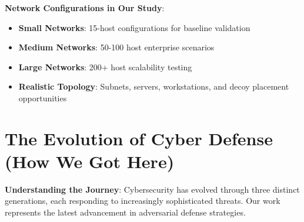\documentclass[11pt]{article}
\begin{document}
\begin{example}
\textbf{Network Configurations in Our Study}:
\begin{itemize}
\item \textbf{Small Networks}: 15-host configurations for baseline validation
\item \textbf{Medium Networks}: 50-100 host enterprise scenarios
\item \textbf{Large Networks}: 200+ host scalability testing
\item \textbf{Realistic Topology}: Subnets, servers, workstations, and decoy placement opportunities
\end{itemize}
\end{example}

\section{The Evolution of Cyber Defense (How We Got Here)}

\begin{foundation}
\textbf{Understanding the Journey}: Cybersecurity has evolved through three distinct generations, each responding to increasingly sophisticated threats. Our work represents the latest advancement in adversarial defense strategies.
\end{foundation}
\end{document}
